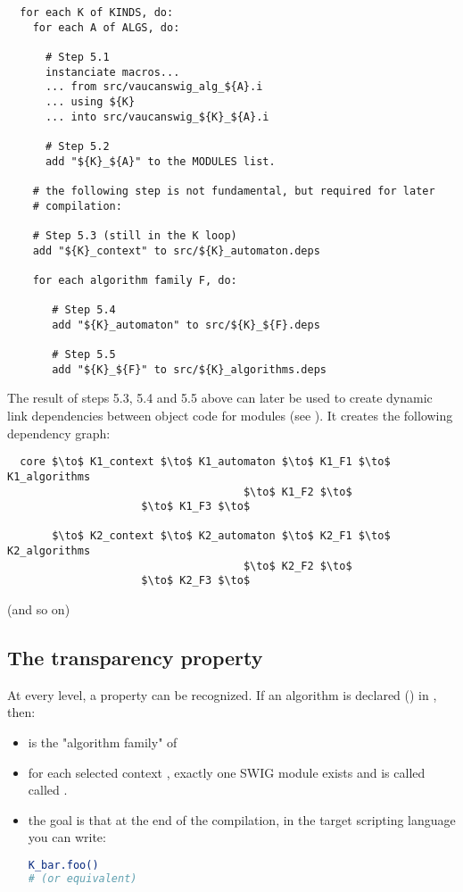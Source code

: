 \begin{lstlisting}
  for each K of KINDS, do:
    for each A of ALGS, do:

      # Step 5.1
      instanciate macros...
      ... from src/vaucanswig_alg_${A}.i
      ... using ${K}
      ... into src/vaucanswig_${K}_${A}.i

      # Step 5.2
      add "${K}_${A}" to the MODULES list.

    # the following step is not fundamental, but required for later
    # compilation:

    # Step 5.3 (still in the K loop)
    add "${K}_context" to src/${K}_automaton.deps

    for each algorithm family F, do:

       # Step 5.4
       add "${K}_automaton" to src/${K}_${F}.deps

       # Step 5.5
       add "${K}_${F}" to src/${K}_algorithms.deps
\end{lstlisting}

The result of steps 5.3, 5.4 and 5.5 above can later be used to create
dynamic link dependencies between object code for modules (see
). It creates the following dependency graph:

\begin{lstlisting}
  core $\to$ K1_context $\to$ K1_automaton $\to$ K1_F1 $\to$ K1_algorithms
                                     $\to$ K1_F2 $\to$
				     $\to$ K1_F3 $\to$

       $\to$ K2_context $\to$ K2_automaton $\to$ K2_F1 $\to$ K2_algorithms
                                     $\to$ K2_F2 $\to$
				     $\to$ K2_F3 $\to$
\end{lstlisting}

  (and so on)

\subsection{The transparency property}

At every level, a property can be recognized. If an algorithm
 is declared (\Cxx) in , then:
\begin{itemize}
\item {} is the "algorithm family" of 

\item for each selected context , exactly one SWIG module exists
  and is called called .

\item the goal is that at the end of the compilation, in the target
  scripting language you can write:
  \begin{lstlisting}[language=sh]
K_bar.foo()
# (or equivalent)
  \end{lstlisting}
\end{itemize}


